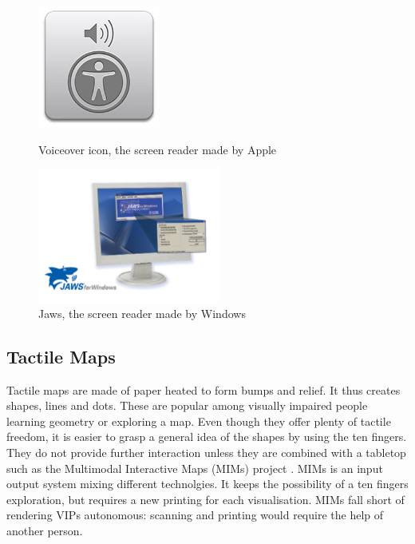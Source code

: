 	\begin{figure}[!ht]
		\begin{minipage}[c]{.46\linewidth}
			\centering
			\includegraphics[width=4cm]{figures/voice_over.jpg}
			\caption{Voiceover icon, the screen reader made by Apple}
  		\end{minipage} \hfill
  		\begin{minipage}[c]{.46\linewidth}
  			\centering
			\includegraphics[width=6cm]{figures/jaws.png}
			\caption{Jaws, the screen reader made by Windows}
		\end{minipage}
	\end{figure}

\subsection{Tactile Maps}\label{tactile-maps}

Tactile maps are made of paper heated to form bumps and relief. It thus
creates shapes, lines and dots. These are popular among visually
impaired people learning geometry or exploring a map. Even though they
offer plenty of tactile freedom, it is easier to grasp a general idea of
the shapes by using the ten fingers. They do not provide further
interaction unless they are combined with a tabletop such as the
Multimodal Interactive Maps (MIMs) project \cite{brock2010usage}. MIMs is an input
output system mixing different technolgies. It keeps the possibility of
a ten fingers exploration, but requires a new printing for each
visualisation. MIMs fall short of rendering VIPs autonomous: scanning
and printing would require the help of another person.

